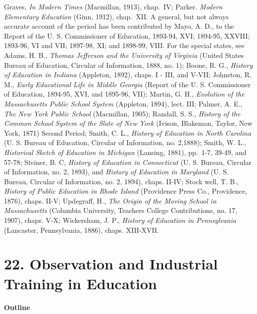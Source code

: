 \documentclass[
]{book}
\begin{document}
Graves, \emph{In Modern Times} (Macmillan, 1913), chap.~IV; Parker. \emph{Modern Elementary Education} (Ginn, 1912), chap.~XII. A general, but not always accurate account of the period has been contributed by Mayo, A. D., to the Report of the U. S. Commissioner of Education, 1893-94, XVI; 1894-95, XXVIII; 1893-96, VI and VII; 1897-98, XI; and 1898-99, VIII. For the special states, see Adams, H. B., \emph{Thomas Jefferson and the University of Virginia} (United States Bureau of Education, Circular of Information, 1888, no. 1); Boone, R. G., \emph{History of Education in Indiana} (Appleton, 1892), chaps. I - III, and V-VII; Johnston, R. M., \emph{Early Educational Life in Middle Georgia} (Report of the U. S. Commissioner of Education, 1894-95, XVI, and 1895-96, VII); Martin, G. H., \emph{Evolution of the Massachusetts Public School System} (Appleton, 1894), lect. III; Palmer, A. E., \emph{The New York Public School} (Macmillan, 1905); Randall, S. S., \emph{History of the Common School System of the Slate of New York} (Ivison, Blakeman, Taylor, New York, 1871) Second Period; Smith, C. L., \emph{History of Education in North Carolina} (U. S. Bureau of Education, Circular of Information, no. 2,1888); Smith, W. L., \emph{Historical Sketch of Education in Michigan} (Lansing, 1881), pp.~1-7, 39-49, and 57-78; Steiner, B. C, \emph{History of Education in Connecticut} (U. S. Bureau, Circular of Information, no. 2, 1893), and \emph{History of Education in Maryland} (U. S. Bureau, Circular of Information, no. 2, 1894), chaps. II-IV; Stock well, T. B., \emph{History of Public Education in Rhode Island} (Providence Press Co., Providence, 1876), chaps. II-V; Updegraff, H., \emph{The Origin of the Moving School in Massachusetts} (Columbia University, Teachers College Contributions, no. 17, 1907), chaps. V-X; Wickersham, J. P., \emph{History of Education in Pennsylvania} (Lancaster, Pennsylvania, 1886), chaps. XIII-XVII.

\hypertarget{observation-and-industrial-training-in-education}{%
\chapter{22. Observation and Industrial Training in Education}\label{observation-and-industrial-training-in-education}}

\textbf{Outline}
\end{document}
